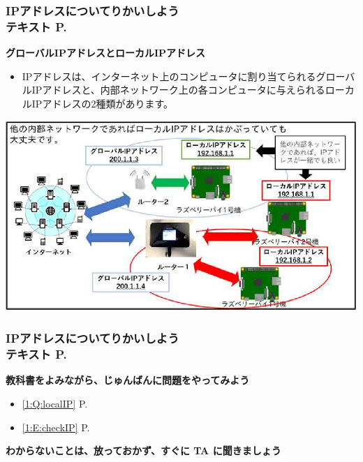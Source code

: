 \begin{frame}[fragile]
	\frametitle{\large{IPアドレスについてりかいしよう\\テキスト P.\pageref{1:P:slide_p12}}~~~}
    \textbf{グローバルIPアドレスとローカルIPアドレス}
            \begin{itemize}\small
                \item IPアドレスは、インターネット上のコンピュータに割り当てられるグローバルIPアドレスと、内部ネットワーク上の各コンピュータに与えられるローカルIPアドレスの2種類があります。
            \end{itemize}
            \vfill
            
			\begin{minipage}{0.7\textwidth}
                {\upshape
                  \includegraphics[width=\textwidth]{text07-img/ome7-img006}}
            \end{minipage}
\end{frame}

\begin{frame}[fragile]
	\frametitle{\large{IPアドレスについてりかいしよう\\テキスト P.\pageref{1:P:slide_p13}}~~~}
    \large\textbf{教科書をよみながら、じゅんばんに問題をやってみよう}
				\begin{itemize}\small
					\item \ref*{1:Q:localIP} P.\pageref{1:Q:localIP}
					\item \ref*{1:E:checkIP} P.\pageref{1:E:checkIP}
				\end{itemize}
      \vfill
      \large\textbf{わからないことは、放っておかず、すぐに TA に聞きましょう}
\end{frame}

